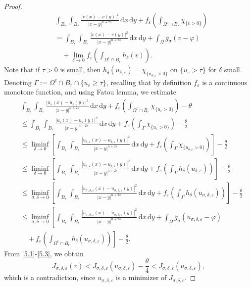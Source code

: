 \documentclass[11pt, reqno]{amsart}
\numberwithin{equation}{section}
\numberwithin{theorem}{section}
\numberwithin{lemma}{section}
\numberwithin{corollary}{section}
\numberwithin{remark}{section}
\numberwithin{proposition}{section}
\numberwithin{definition}{section}
\newcommand{\e}{\varepsilon}
\begin{document}
\begin{proof}
\begin{equation}
	\begin{split}
	&\int_{B_r}\int_{B_{r}}\frac{|v(x)-v(y)|^{2}}{|x-y|^{n+2s}}\,\mathrm{d}x\,\mathrm{d}y+f_\varepsilon\left(\int_{\Omega^c\cap B_r}\chi_{\{v>0\}}\right) \\
	&=\int_{B_r}\int_{B_{r}}\frac{|v(x)-v(y)|^{2}}{|x-y|^{n+2s}}\,\mathrm{d}x\,\mathrm{d}y+\int_\Omega g_\sigma(v-\varphi) \\
    & \quad  +\lim_{\delta\rightarrow0}f_\varepsilon\left(\int_{\Omega^c\cap B_r}h_\delta(v)\right).
	\end{split}
	\end{equation}
	Note that if $\tau>0$ is small, then $h_\delta(u_{\delta,\varepsilon})=\chi_{\{u_{\delta,\varepsilon}>0\}}$ on $\{u_\varepsilon>\tau\}$ for $\delta$ small. Denoting $\Gamma:=\Omega^c\cap B_r\cap\{u_\varepsilon\geq\tau\}$, recalling that by definition $f_
    \varepsilon$ is a continuous monotone function, and using Fatou lemma, we estimate
	\begin{equation}\label{5.3}
	\begin{split}
	&\int_{B_r}\int_{B_{r}}\frac{|u_\e(x)-u_\e(y)|^{2}}{|x-y|^{n+2s}}\,\mathrm{d}x\,\mathrm{d}y+f_\varepsilon\left(\int_{\Omega^c\cap B_r}\chi_{\{u_\varepsilon>0\}}\right)-\theta\\
	&\leq\int_{B_r}\int_{B_{r}}\frac{|u_\e(x)-u_\e(y)|^{2}}{|x-y|^{n+2s}}\,\mathrm{d}x\,\mathrm{d}y+f_\varepsilon\left(\int_{\Gamma}\chi_{\{u_\varepsilon>0\}}\right)-\frac{\theta}{2}\\	&\leq\liminf_{\delta\rightarrow0}\left[\int_{B_r}\int_{B_{r}}\frac{|u_{\delta,\e}(x)-u_{\delta,\e}(y)|^{2}}{|x-y|^{n+2s}}\,\mathrm{d}x\,\mathrm{d}y+f_\varepsilon\left(\int_{\Gamma}\chi_{\{u_{\delta,\varepsilon}>0\}}\right)\right]-\frac{\theta}{2}\\
	&\le\liminf_{\delta\rightarrow0}\left[\int_{B_r}\int_{B_{r}}\frac{|u_{\delta,\e}(x)-u_{\delta,\e}(y)|^{2}}{|x-y|^{n+2s}}\,\mathrm{d}x\,\mathrm{d}y+f_\varepsilon\left(\int_{\Gamma}h_\delta(u_{\delta,\varepsilon})\right)\right]-\frac{\theta}{2}\\
	&\leq\liminf_{\sigma,\delta\rightarrow0}\left[\int_{B_r}\int_{B_{r}}\frac{|u_{\sigma,\delta,\e}(x)-u_{\sigma,\delta,\e}(y)|^{2}}{|x-y|^{n+2s}}\,\mathrm{d}x\,\mathrm{d}y+f_\varepsilon\left(\int_{\Gamma}h_\delta(u_{\sigma,\delta,\varepsilon})\right)\right]-\frac{\theta}{2}\\
	&\leq\liminf_{\sigma,\delta\rightarrow0}\left[\int_{B_r}\int_{B_{r}}\frac{|u_{\sigma,\delta,\e}(x)-u_{\sigma,\delta,\e}(y)|^{2}}{|x-y|^{n+2s}}\,\mathrm{d}x\,\mathrm{d}y+\int_\Omega g_\sigma(u_{\sigma,\delta,\varepsilon}-\varphi)\right.\\
	&\quad+\left.f_\varepsilon\left(\int_{\Omega^c\cap B_r}h_\delta(u_{\sigma,\delta,\varepsilon})\right)\right]-\frac{\theta}{2}.
	\end{split}
	\end{equation}
	From \eqref{5.1}-\eqref{5.3}, we obtain
	$$
	J_{\sigma,\delta,\varepsilon}(v)<J_{\sigma,\delta,\varepsilon}(u_{\sigma,\delta,\varepsilon}) -\frac{\theta}{4}<J_{\sigma,\delta,\varepsilon}(u_{\sigma,\delta,\varepsilon}), 
	$$
	which is a contradiction, since $u_{\sigma,\delta,\varepsilon}$ is a minimizer of $J_{\sigma,\delta,\e}$.
\end{proof}  
\end{document}
